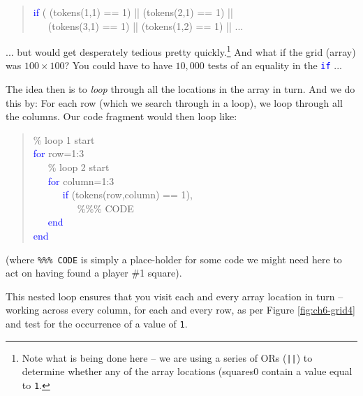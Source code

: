 \documentclass{tufte-book} %
\newenvironment{docspec}{\begin{quotation}\ttfamily\parskip0pt\parindent0pt\ignorespaces}{\end{quotation}}
\begin{document}
\newpage 

\begin{docspec}
\textcolor{blue}{if} ( (tokens(1,1) == 1) || (tokens(2,1) == 1) ||\\
\ \ \ (tokens(3,1) == 1) || (tokens(1,2) == 1) || ...
\end{docspec}
... but would get desperately tedious pretty quickly.\footnote{Note what is being done here -- we are using a series of ORs (\texttt{||}) to determine whether any of the array locations (squares0 contain a value equal to \texttt{1}.} And what if the grid (array) was \(100\times 100\)? You could have to have \(10,000\) tests of an equality in the \texttt{\textcolor{blue}{if}} ...

The idea then is to \textit{loop} through all the locations in the array in turn. And we do this by: For each row (which we search through in a loop), we loop through all the columns. Our code fragment would then loop like:
\begin{docspec}
\textcolor[rgb]{0,0.501961,0}{\% loop 1 start\\}
\textcolor{blue}{for} row=1:3\\
\ \ \ \textcolor[rgb]{0,0.501961,0}{\% loop 2 start\\}
\ \ \ \textcolor{blue}{for} column=1:3\\
\ \ \ \ \ \ \textcolor{blue}{if} (tokens(row,column) == 1),\\
\ \ \ \ \ \ \ \ \ \textcolor[rgb]{0,0.501961,0}{\%\%\% CODE}\\
\ \ \ \textcolor{blue}{end}\\
\textcolor{blue}{end}
\end{docspec}
(where \texttt{\textcolor[rgb]{0,0.501961,0}{\%\%\% CODE}} is simply a place-holder for some code we might need here to act on having found a player \#1 square).

This nested loop ensures that you  visit each and every array location in turn -- working across every column, for each and every row, as per Figure \ref{fig:ch6-grid4} and test for the occurrence of a value of \texttt{1}.
\end{document}
